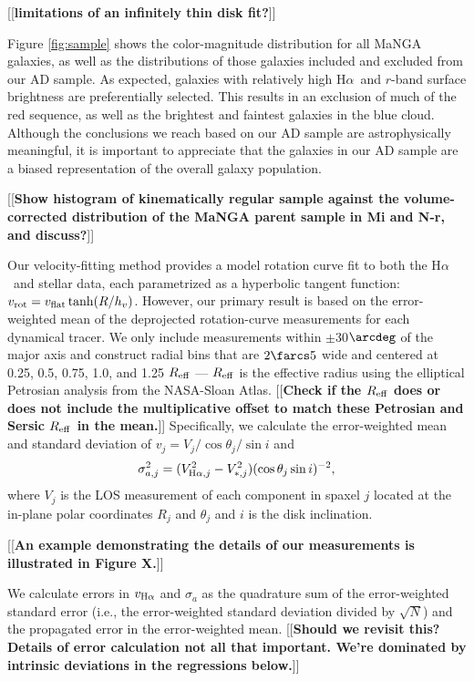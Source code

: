 \documentclass[apj,iop,revtex4,numberedappendix]{emulateapj}
\newcommand{\comment}[2][todo]{{\color{#1}[[{\bf #2}]]}}
\newcommand{\halpha}{H$\alpha$}
\begin{document}
\comment{limitations of an infinitely thin disk fit?}

Figure \ref{fig:sample} shows the color-magnitude distribution for all
MaNGA galaxies, as well as the distributions of those galaxies included
and excluded from our AD sample.  As expected, galaxies with relatively
high \halpha\ and $r$-band surface brightness are preferentially
selected.  This results in an exclusion of much of the red sequence, as
well as the brightest and faintest galaxies in the blue cloud.  Although
the conclusions we reach based on our AD sample are astrophysically
meaningful, it is important to appreciate that the galaxies in our AD
sample are a biased representation of the overall galaxy population.

\comment{Show histogram of kinematically regular sample against the
volume-corrected distribution of the MaNGA parent sample in Mi and N-r,
and discuss?}

Our velocity-fitting method provides a model rotation curve fit to both
the \halpha\ and stellar data, each parametrized as a hyperbolic tangent
function: $v_{\rm rot} = v_{\rm flat} \tanh(R/h_v)$.  However, our
primary result is based on the error-weighted mean of the deprojected
rotation-curve measurements for each dynamical tracer.  We only include
measurements within $\pm$30$\arcdeg$ of the major axis and construct
radial bins that are $2\farcs5$ wide and centered at 0.25, 0.5, 0.75,
1.0, and 1.25 $R_{\rm eff}$ --- $R_{\rm eff}$ is the effective radius
using the elliptical Petrosian analysis from the NASA-Sloan Atlas.
\comment{Check if the $R_{\rm eff}$ does or does not include the
multiplicative offset to match these Petrosian and Sersic $R_{\rm eff}$
in the mean.}  Specifically, we calculate the error-weighted mean and
standard deviation of $v_j = V_j/\cos\theta_j/\sin i$ and
%
\begin{equation}
%
\sigma_{a,j}^2 = (V_{{\rm H}\alpha,j}^2 - V_{\ast,j}^2) (\cos\theta_j
\sin i)^{-2},
%
\label{eq:dproj}
%
\end{equation}
%
where $V_j$ is the LOS measurement of each component in spaxel $j$
located at the in-plane polar coordinates $R_j$ and $\theta_j$ and $i$
is the disk inclination.

\comment{An example demonstrating the details of our measurements is
illustrated in Figure X.}

We calculate errors in $v_{{\rm H}\alpha}$ and $\sigma_a$ as the
quadrature sum of the error-weighted standard error (i.e., the
error-weighted standard deviation divided by $\sqrt{N}$) and the
propagated error in the error-weighted mean. \comment{Should we revisit
this?  Details of error calculation not all that important.  We're
dominated by intrinsic deviations in the regressions below.}
\end{document}
